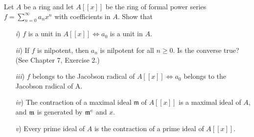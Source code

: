 \documentclass[10pt]{amsart}
\begin{document}
\begin{exercise}
    Let $A$ be a ring and let $A[[x]]$ be the ring of formal power series $f = \sum_{n = 0}^{\infty}a_nx^n$ with coefficients in $A$. Show that
    \begin{itemize}
        \item[\emph{i})] $f$ is a unit in $A[[x]] \iff a_0$ is a unit in $A$.
        \item[\emph{ii})] If $f$ is nilpotent, then $a_n$ is nilpotent for all $n \ge 0$. Is the converse true? (See Chapter 7, Exercise 2.)
        \item[\emph{iii})] $f$ belongs to the Jacobson radical of $A[[x]] \iff a_0$ belongs to the Jacobson radical of A.
        \item[\emph{iv})] The contraction of a maximal ideal $\mathfrak{m}$ of $A[[x]]$ is a maximal ideal of $A$, and
        $\mathfrak{m}$ is generated by $\mathfrak{m}^c$ and $x$.
        \item[\emph{v})] Every prime ideal of $A$ is the contraction of a prime ideal of $A[[x]]$. 
    \end{itemize}
\end{exercise}
\end{document}
